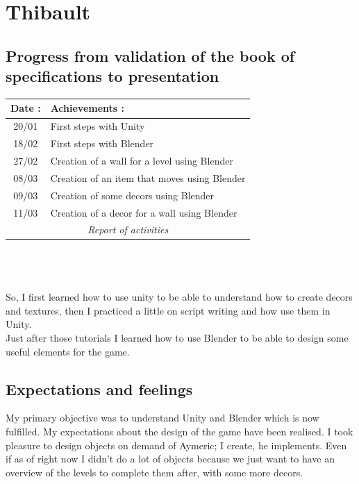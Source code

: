 	\section{Thibault}
		\subsection{Progress from validation of the book of specifications to  presentation}
			\begin{tabular}{|c|l|}
				\hline \cellcolor{gray}Date :	& \cellcolor{gray}Achievements :\\
				\hline 20/01& First steps with Unity\\
				\hline 18/02& First steps with Blender\\
				\hline 27/02& Creation of a wall for a level using Blender\\
				\hline 08/03& Creation of an item that moves using Blender\\
				\hline 09/03& Creation of some decors using Blender\\
				\hline 11/03& Creation of a decor for a wall using Blender\\
				\hline \multicolumn{2}{c}{\textit{Report of activities}}
			\end{tabular}
			\\\\\\
			So, I first learned how to use unity to be able to understand how to create decors and textures, then I practiced a little on script writing and how use them in Unity.
			\\
			Just after those tutorials I learned how to use Blender to be able to design some useful elements for the game.


		\subsection{Expectations and feelings}
			My primary objective was to understand Unity and Blender which is now fulfilled. My expectations about the design of the game have been realised. I took pleasure to design objects on demand of Aymeric; I create, he implements. Even if as of right now I didn't do a lot of objects because we just want to have an overview of the levels to complete them after, with some more decors.
